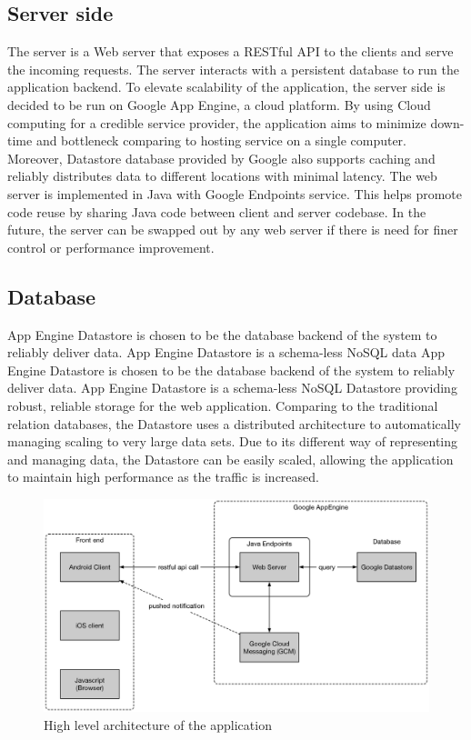 \subsection{Server side}

The server is a Web server that exposes a RESTful API to the clients and serve the incoming requests. The server interacts with a persistent database to run the application backend.
To elevate scalability of the application, the server side is decided to be run on Google App Engine, a cloud platform. By using Cloud computing for a credible service provider, the application aims to minimize down-time and bottleneck comparing to hosting service on a single computer. Moreover, Datastore database provided by Google also supports caching and reliably distributes data to different locations with minimal latency.
The web server is implemented in Java with Google Endpoints service. This helps promote code reuse by sharing Java code between client and server codebase. In the future, the server can be swapped out by any web server if there is need for finer control or performance improvement.

\subsection{Database}

App Engine Datastore is chosen to be the database backend of the system to reliably deliver data. App Engine Datastore is a schema-less NoSQL data
App Engine Datastore is chosen to be the database backend of the system to reliably deliver data. App Engine Datastore is a schema-less NoSQL Datastore providing robust, reliable storage for the web application.
Comparing to the traditional relation databases, the Datastore uses a distributed architecture to automatically managing scaling to very large data sets. Due to its different way of representing and managing data, the Datastore can be easily scaled, allowing the application to maintain high performance as the traffic is increased.

\begin{figure}
\includegraphics[width=\textwidth]{Architecture}
\caption{High level architecture of the application}
\end{figure}

